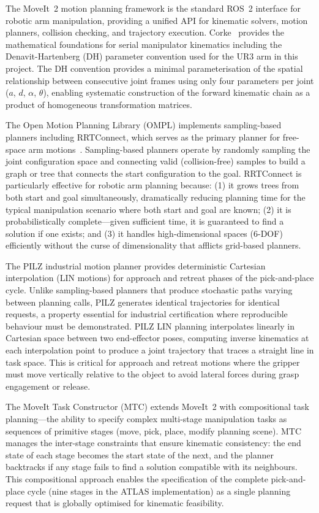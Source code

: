 \documentclass[12pt,a4paper,oneside]{report}
\begin{document}
The MoveIt~2 motion planning framework is the standard ROS~2 interface for robotic arm manipulation, providing a unified API for kinematic solvers, motion planners, collision checking, and trajectory execution. Corke~\cite{corke2017} provides the mathematical foundations for serial manipulator kinematics including the Denavit-Hartenberg (DH) parameter convention used for the UR3 arm in this project. The DH convention provides a minimal parameterisation of the spatial relationship between consecutive joint frames using only four parameters per joint ($a$, $d$, $\alpha$, $\theta$), enabling systematic construction of the forward kinematic chain as a product of homogeneous transformation matrices.

The Open Motion Planning Library (OMPL) implements sampling-based planners including RRTConnect, which serves as the primary planner for free-space arm motions~\cite{dudek2010}. Sampling-based planners operate by randomly sampling the joint configuration space and connecting valid (collision-free) samples to build a graph or tree that connects the start configuration to the goal. RRTConnect is particularly effective for robotic arm planning because: (1) it grows trees from both start and goal simultaneously, dramatically reducing planning time for the typical manipulation scenario where both start and goal are known; (2) it is probabilistically complete---given sufficient time, it is guaranteed to find a solution if one exists; and (3) it handles high-dimensional spaces (6-DOF) efficiently without the curse of dimensionality that afflicts grid-based planners.

The PILZ industrial motion planner provides deterministic Cartesian interpolation (LIN motions) for approach and retreat phases of the pick-and-place cycle. Unlike sampling-based planners that produce stochastic paths varying between planning calls, PILZ generates identical trajectories for identical requests, a property essential for industrial certification where reproducible behaviour must be demonstrated. PILZ LIN planning interpolates linearly in Cartesian space between two end-effector poses, computing inverse kinematics at each interpolation point to produce a joint trajectory that traces a straight line in task space. This is critical for approach and retreat motions where the gripper must move vertically relative to the object to avoid lateral forces during grasp engagement or release.

The MoveIt Task Constructor (MTC) extends MoveIt~2 with compositional task planning---the ability to specify complex multi-stage manipulation tasks as sequences of primitive stages (move, pick, place, modify planning scene). MTC manages the inter-stage constraints that ensure kinematic consistency: the end state of each stage becomes the start state of the next, and the planner backtracks if any stage fails to find a solution compatible with its neighbours. This compositional approach enables the specification of the complete pick-and-place cycle (nine stages in the ATLAS implementation) as a single planning request that is globally optimised for kinematic feasibility.
\end{document}
